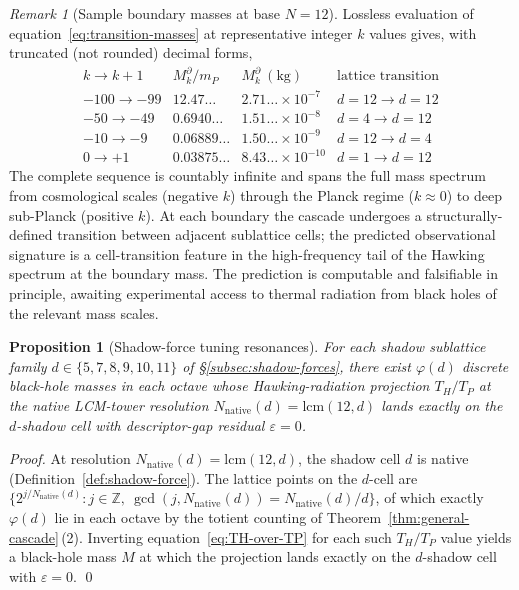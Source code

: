 \documentclass[11pt,a4paper]{article}
\newtheorem{proposition}[theorem]{Proposition}
\theoremstyle{definition}
\theoremstyle{remark}
\newtheorem{remark}[theorem]{Remark}
\begin{document}
\begin{remark}[Sample boundary masses at base $N = 12$]\label{rem:transition-sample}
Lossless evaluation of equation~\eqref{eq:transition-masses} at representative integer $k$ values gives, with truncated (not rounded) decimal forms,
\[
\begin{array}{r|c|c|l}
k \to k+1 & M_{k}^{\partial}/m_{P} & M_{k}^{\partial}~(\text{kg}) & \text{lattice transition} \\ \hline
-100 \to -99 & 12.47\ldots  & 2.71\ldots\times 10^{-7} & d=12 \to d=12 \\
 -50 \to  -49 & 0.6940\ldots & 1.51\ldots\times 10^{-8} & d=4 \to d=12 \\
 -10 \to   -9 & 0.06889\ldots & 1.50\ldots\times 10^{-9} & d=12 \to d=4 \\
   0 \to   +1 & 0.03875\ldots & 8.43\ldots\times 10^{-10} & d=1 \to d=12
\end{array}
\]
The complete sequence is countably infinite and spans the full mass spectrum from cosmological scales (negative $k$) through the Planck regime ($k \approx 0$) to deep sub-Planck (positive $k$). At each boundary the cascade undergoes a structurally-defined transition between adjacent sublattice cells; the predicted observational signature is a cell-transition feature in the high-frequency tail of the Hawking spectrum at the boundary mass. The prediction is computable and falsifiable in principle, awaiting experimental access to thermal radiation from black holes of the relevant mass scales.
\end{remark}

\begin{proposition}[Shadow-force tuning resonances]\label{prop:shadow-tuning}
For each shadow sublattice family $d \in \{5,7,8,9,10,11\}$ of \S\ref{subsec:shadow-forces}, there exist $\varphi(d)$ discrete black-hole masses in each octave whose Hawking-radiation projection $T_{H}/T_{P}$ at the native LCM-tower resolution $N_{\text{native}}(d) = \mathrm{lcm}(12,d)$ lands exactly on the $d$-shadow cell with descriptor-gap residual $\varepsilon = 0$.
\end{proposition}

\begin{proof}
At resolution $N_{\text{native}}(d) = \mathrm{lcm}(12,d)$, the shadow cell $d$ is native (Definition~\ref{def:shadow-force}). The lattice points on the $d$-cell are $\{2^{j/N_{\text{native}}(d)} : j \in \mathbb{Z},\ \gcd(j, N_{\text{native}}(d)) = N_{\text{native}}(d)/d\}$, of which exactly $\varphi(d)$ lie in each octave by the totient counting of Theorem~\ref{thm:general-cascade}\,(2). Inverting equation~\eqref{eq:TH-over-TP} for each such $T_{H}/T_{P}$ value yields a black-hole mass $M$ at which the projection lands exactly on the $d$-shadow cell with $\varepsilon = 0$. \qed
\end{proof}
\end{document}
